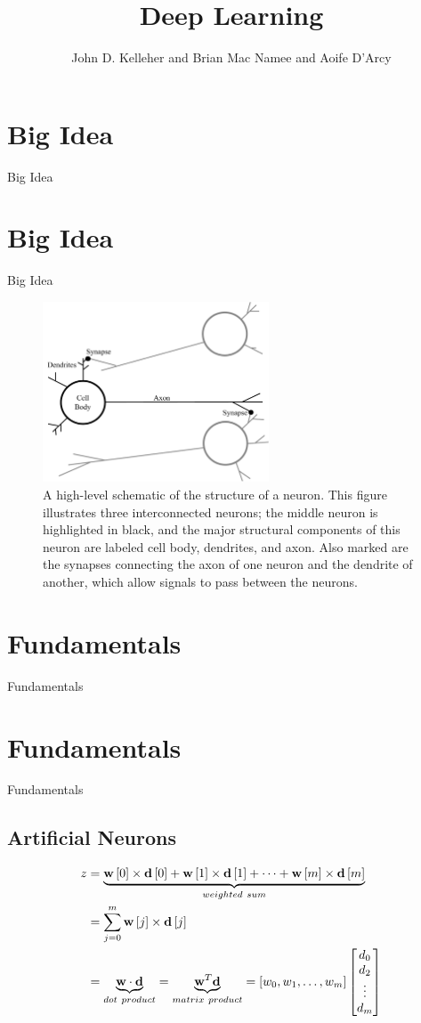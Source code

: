 \documentclass[xcolor={table}]{beamer}
\title{Deep Learning}
\author{John D. Kelleher and Brian Mac Namee and Aoife D'Arcy}
\institute{}
\date{}
\newcommand{\SectionSlide}[2][]{
	\ifthenelse{\isempty{#1}}
		{\section{#2}\begin{frame} \begin{center}\begin{huge}#2\end{huge}\end{center}\end{frame}}
		{\section[#1]{#2}\begin{frame} \begin{center}\begin{huge}#2\end{huge}\end{center}\end{frame}}
}
\begin{document}
\begin{frame}
	\titlepage
\end{frame}
\begin{frame}
	 \tableofcontents[hideallsubsections]
\end{frame}

\SectionSlide{Big Idea}



 \begin{frame} 
\begin{figure}[t]
\centerline{
\includegraphics[width=0.6\textwidth]{./images/fmlpda_8_01.pdf}
}
\caption[A high-level schematic of the structure of a neuron.]{A high-level schematic of the structure of a neuron. This figure illustrates three interconnected neurons; the middle neuron is highlighted in black, and the major structural components of this neuron are labeled cell body, dendrites, and axon. Also marked are the synapses connecting the axon of one neuron and the dendrite of another, which allow signals to pass between the neurons. }
\label{fig:dlfig1-brainneuron}
\end{figure}
\end{frame} 


\SectionSlide{Fundamentals}

\subsection{Artificial Neurons}

 \begin{frame} 
	\begin{alignat}{2}
z & =  \underbrace{\mathbf{w}\left[0\right]\times \mathbf{d}\left[0\right] + \mathbf{w}\left[1\right] \times \mathbf{d}\left[1\right] + \dots + \mathbf{w}\left[m\right] \times \mathbf{d}\left[m\right]}_{weighted~sum} \\
	& =  \sum_{j=0}^{m} \mathbf{w}\left[j\right]\times \mathbf{d}\left[j\right] \notag\\
& = \underbrace{\mathbf{w} \cdot \mathbf{d}}_{dot~product} = \underbrace{\mathbf{w}^T \mathbf{d}}_{matrix~product} = [w_0,w_1,\dots,w_m] \begin{bmatrix}
       d_{0} \\
       d_{2} \\
       \vdots \\
       d_{m}
     \end{bmatrix}
\label{eqn:weightedsum}
	\end{alignat}
\end{frame} 
\end{document}
